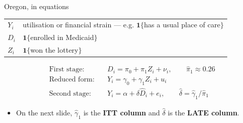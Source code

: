 \documentclass[
  11pt,
  ignorenonframetext,
  aspectratio=169,
]{beamer}
\providecommand{\tightlist}{%
  \setlength{\itemsep}{0pt}\setlength{\parskip}{0pt}}
\begin{document}
\begin{frame}{Oregon, in equations}
\protect{}\label{oregon-in-equations}
\begin{center}\small
\begin{tabular}{ll}
\toprule
$Y_i$ & utilisation or financial strain --- e.g. $\mathbf{1}\{$has a usual place of care$\}$ \\
$D_i$ & $\mathbf{1}\{$enrolled in Medicaid$\}$ \\
$Z_i$ & $\mathbf{1}\{$won the lottery$\}$ \\
\bottomrule
\end{tabular}
\end{center}

\vspace{-0.3em}

\begin{align*}
\text{First stage:}\quad & D_i = \pi_0 + \pi_1 Z_i + \nu_i, \qquad \hat\pi_1 \approx 0.26 \\
\text{Reduced form:}\quad & Y_i = \gamma_0 + \gamma_1 Z_i + u_i \\
\text{Second stage:}\quad & Y_i = \alpha + \delta \hat D_i + e_i, \qquad \hat\delta = \hat\gamma_1 / \hat\pi_1
\end{align*}

\vspace{-0.3em}

\begin{itemize}
\tightlist
\item
  On the next slide, \(\hat\gamma_1\) is the \textbf{ITT column} and
  \(\hat\delta\) is the \textbf{LATE column}.
\end{itemize}
\end{frame}
\end{document}
